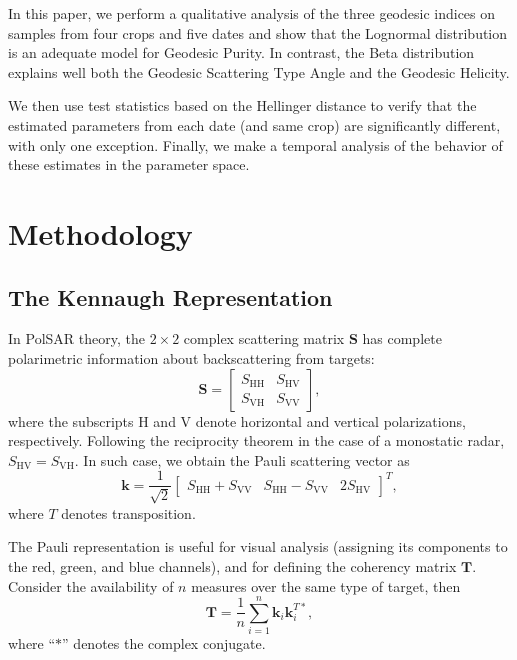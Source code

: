 \documentclass[journal]{IEEEtran}
\begin{document}
	
	
	In this paper, we perform a qualitative analysis of the three geodesic indices on samples from four crops and five dates and show that the Lognormal distribution is an adequate model for Geodesic Purity. 
	In contrast, the Beta distribution explains well both the Geodesic Scattering Type Angle and the Geodesic Helicity.
	
	We then use test statistics based on the Hellinger distance to verify that the estimated parameters from each date (and same crop) are significantly different, with only one exception.
	Finally, we make a temporal analysis of the behavior of these estimates in the parameter space.
	
	\section{Methodology}
	
	\subsection{The Kennaugh Representation}
	
	In PolSAR theory, the $2 \times 2$ complex scattering matrix $\bm S$ has
	complete polarimetric information about backscattering
	from targets:
	$$
	\bm S = \begin{bmatrix}
	S_{\text{HH}} &S_{\text{HV}}\\
	S_{\text{VH}} &S_{\text{VV}}
	\end{bmatrix},
	$$
	where the subscripts $\text{H}$ and $\text{V}$ denote horizontal and vertical
	polarizations, respectively. 
	Following the reciprocity theorem
	in the case of a monostatic radar, 
	$S_{\text{HV}}=S_{\text{VH}}$.
	In such case, we obtain the Pauli scattering vector as
	$$
	\bm k = \frac1{\sqrt{2}}
	\begin{bmatrix}
	S_{\text{HH}} + S_{\text{VV}} 
	& S_{\text{HH}} - S_{\text{VV}} 
	& 2S_{\text{HV}}
	\end{bmatrix}^T,
	$$
	where $T$ denotes transposition.
	
	The Pauli representation is useful for visual analysis (assigning its components to the red, green, and blue channels), and for defining the coherency matrix $\bm T$.
	Consider the availability of $n$ measures over the same type of target, then
	$$
	\bm T = \frac{1}{n} \sum_{i=1}^{n}\bm k_i \bm k_i^{T*},
	$$
	where ``$*$'' denotes the complex conjugate.
	
\end{document}
